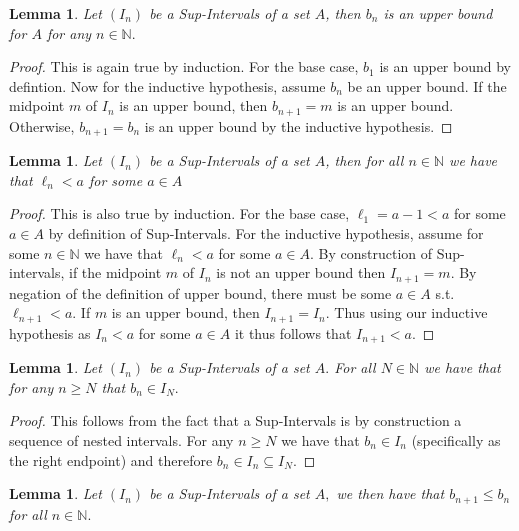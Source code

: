\documentclass[10pt]{article}
\newtheorem{lemma}[]{Lemma}
\begin{document}
\begin{lemma} \label{lem:b}
    Let $(I_n)$ be a Sup-Intervals of a set $A$, then $b_n$ is an upper bound for $A$ for any $n\in\mathbb{N}.$
\end{lemma}

\begin{proof}
    This is again true by induction. For the base case, $b_1$ is an upper bound by defintion. Now for the inductive hypothesis, assume $b_n$ be an upper bound. If the midpoint $m$ of $I_n$ is an upper bound, then $b_{n+1}=m$ is an upper bound. Otherwise, $b_{n+1}=b_n$ is an upper bound by the inductive hypothesis.
\end{proof}

\begin{lemma} \label{lem:l}
    Let $(I_n)$ be a Sup-Intervals of a set $A$, then for all $n\in\mathbb{N}$ we have that $\ell_n < a$ for some $a\in A$
\end{lemma}

\begin{proof}
    This is also true by induction. For the base case, $\ell_1 = a - 1 < a$ for some $a\in A$ by definition of Sup-Intervals. For the inductive hypothesis, assume for some $n\in\mathbb{N}$ we have that $\ell_n < a$ for some $a\in A.$ By construction of Sup-intervals, if the midpoint $m$ of $I_n$ is not an upper bound then $I_{n+1} = m.$ By negation of the definition of upper bound, there must be some $a\in A$ s.t. $\ell_{n+1}<a.$ If $m$ is an upper bound, then $I_{n+1}=I_{n}.$ Thus using our inductive hypothesis as $I_n<a$ for some $a\in A$ it thus follows that $I_{n+1}<a.$
\end{proof}

\begin{lemma} \label{lem:in}
    Let $(I_n)$ be a Sup-Intervals of a set $A.$ For all $N\in\mathbb{N}$ we have that for any $n\ge N$ that $b_n\in I_N.$
\end{lemma}

\begin{proof}
    This follows from the fact that a Sup-Intervals is by construction a sequence of nested intervals. For any $n\ge N$ we have that $b_n\in I_n$ (specifically as the right endpoint) and therefore $b_n\in I_n \subseteq I_N.$
\end{proof}

\begin{lemma} \label{lem:d}
    Let $(I_n)$ be a Sup-Intervals of a set $A,$ we then have that $b_{n+1}\le b_n$ for all $n\in\mathbb{N}.$
\end{lemma}
\end{document}
